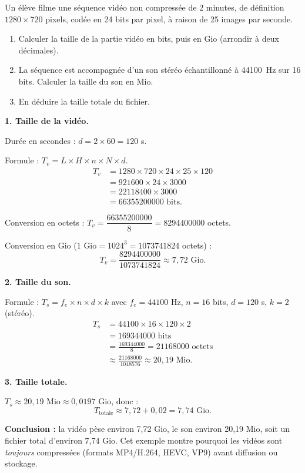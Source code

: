 \documentclass[11pt]{article}
\begin{document}
\begin{exoresolu}
Un élève filme une séquence vidéo non compressée de 2 minutes, de définition $1280 \times 720$ pixels, codée en 24 bits par pixel, à raison de 25 images par seconde.
\begin{enumerate}
  \item Calculer la taille de la partie vidéo en bits, puis en Gio (arrondir à deux décimales).
  \item La séquence est accompagnée d'un son stéréo échantillonné à \SI{44100}{Hz} sur 16 bits. Calculer la taille du son en Mio.
  \item En déduire la taille totale du fichier.
\end{enumerate}
\tcblower
\textbf{1. Taille de la vidéo.}

Durée en secondes : $d = 2 \times 60 = 120$ s.

Formule : $T_v = L \times H \times n \times N \times d$.
\begin{align*}
T_v &= 1280 \times 720 \times 24 \times 25 \times 120 \\
    &= \num{921600} \times 24 \times 3000 \\
    &= \num{22118400} \times 3000 \\
    &= \num{66355200000} \text{ bits.}
\end{align*}

Conversion en octets : $T_v = \dfrac{\num{66355200000}}{8} = \num{8294400000}$ octets.

Conversion en Gio ($1 \text{ Gio} = 1024^3 = \num{1073741824}$ octets) :
\[ T_v = \frac{\num{8294400000}}{\num{1073741824}} \approx 7,72 \text{ Gio.} \]

\textbf{2. Taille du son.}

Formule : $T_s = f_e \times n \times d \times k$ avec $f_e = 44100$ Hz, $n = 16$ bits, $d = 120$ s, $k = 2$ (stéréo).
\begin{align*}
T_s &= 44100 \times 16 \times 120 \times 2 \\
    &= \num{169344000} \text{ bits} \\
    &= \frac{\num{169344000}}{8} = \num{21168000} \text{ octets} \\
    &\approx \frac{\num{21168000}}{\num{1048576}} \approx 20,19 \text{ Mio.}
\end{align*}

\textbf{3. Taille totale.}

$T_s \approx 20,19 \text{ Mio} \approx 0,0197 \text{ Gio}$, donc :
\[ T_{\text{totale}} \approx 7,72 + 0,02 = 7,74 \text{ Gio.} \]

\textbf{Conclusion :} la vidéo pèse environ 7,72 Gio, le son environ 20,19 Mio, soit un fichier total d'environ 7,74 Gio. Cet exemple montre pourquoi les vidéos sont \emph{toujours} compressées (formats MP4/H.264, HEVC, VP9) avant diffusion ou stockage.
\end{exoresolu}
\end{document}
